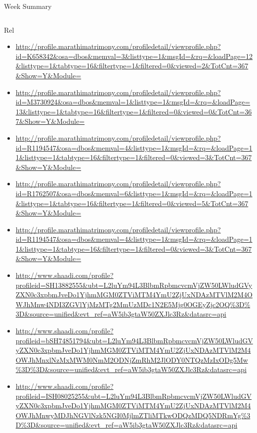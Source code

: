 \documentclass[serif, mathserif, final]{beamer}
\begin{document}
\begin{frame}
\begin{columns}
\begin{column}{0.5\linewidth}
\begin{block}{Week Summary}
\begin{column}{0.25\linewidth}
\begin{block}{Rel}

\begin{itemize}
\item \small
  \url{http://profile.marathimatrimony.com/profiledetail/viewprofile.php?id=K658342&osa=dbos&memval=3&listtype=1&msgId=&rq=&loadPage=12&listtype=1&tabtype=16&filtertype=1&filtered=0&viewed=2&TotCnt=367&Show=Y&Module=} 
\item \small \url{http://profile.marathimatrimony.com/profiledetail/viewprofile.php?id=M3730924&osa=dbos&memval=1&listtype=1&msgId=&rq=&loadPage=13&listtype=1&tabtype=16&filtertype=1&filtered=0&viewed=0&TotCnt=367&Show=Y&Module=}
  
\item \small \url{http://profile.marathimatrimony.com/profiledetail/viewprofile.php?id=R1194547&osa=dbos&memval=4&listtype=1&msgId=&rq=&loadPage=11&listtype=1&tabtype=16&filtertype=1&filtered=0&viewed=3&TotCnt=367&Show=Y&Module=}
  
\item \small \url{http://profile.marathimatrimony.com/profiledetail/viewprofile.php?id=R1762507&osa=dbos&memval=6&listtype=1&msgId=&rq=&loadPage=1&listtype=1&tabtype=16&filtertype=1&filtered=0&viewed=5&TotCnt=367&Show=Y&Module=}

\item \small \url{http://profile.marathimatrimony.com/profiledetail/viewprofile.php?id=R1194547&osa=dbos&memval=4&listtype=1&msgId=&rq=&loadPage=11&listtype=1&tabtype=16&filtertype=1&filtered=0&viewed=3&TotCnt=367&Show=Y&Module=}

\item \small \url{http://www.shaadi.com/profile?profileid=SH13882555&ubt=L2luYm94L3BlbmRpbmcvcmVjZW50LWludGVyZXN0c3xpbmJveDo1YjhmMGM0ZTViMTM4YmU2ZjUxNDAzMTVlM2M4OWJhMnw4NDI3ZGVlYjMzMTg2MmUzMDc1N2E5Mjg0OGEyZjc2OQ\%3D\%3D&source=unified&evt_ref=aW5ib3gtaW50ZXJlc3Rz&datasrc=api}

\item \small \url{http://www.shaadi.com/profile?profileid=bSH74851794&ubt=L2luYm94L3BlbmRpbmcvcmVjZW50LWludGVyZXN0c3xpbmJveDo1YjhmMGM0ZTViMTM4YmU2ZjUxNDAzMTVlM2M4OWJhMnxlNzMxMWM0NmM2ODNjZmRhM2JlODY0NTQzMzIxODg5Mw\%3D\%3D&source=unified\&evt_ref=aW5ib3gtaW50ZXJlc3Rz&datasrc=api}

\item \small \url{http://www.shaadi.com/profile?profileid=ISH08025255&ubt=L2luYm94L3BlbmRpbmcvcmVjZW50LWludGVyZXN0c3xpbmJveDo1YjhmMGM0ZTViMTM4YmU2ZjUxNDAzMTVlM2M4OWJhMnwyMDJhNGVlNzk5NGI0MjlmZTliMTkwODQzMDQ5NDRmYg\%3D\%3D&source=unified&evt_ref=aW5ib3gtaW50ZXJlc3Rz&datasrc=api} 
\end{itemize} 
\end{block} 


\end{column}
\end{block}
\end{column}
\end{columns}
\end{frame}
\end{document}
